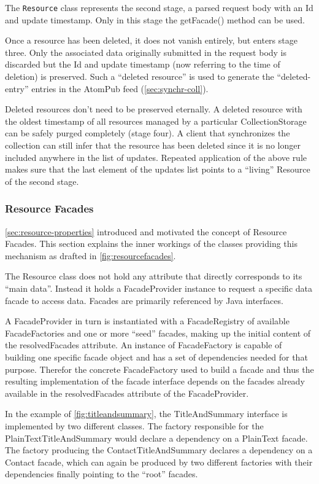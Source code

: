 \documentclass[12pt,a4paper,twoside]{scrartcl}		%
\begin{document}
The \lstinline:Resource: class represents the second stage, a parsed request
body with an Id and update timestamp. Only in this stage the getFacade() method
can be used.

Once a resource has been deleted, it does not vanish entirely, but enters stage
three. Only the associated data originally submitted in the request body is
discarded but the Id and update timestamp (now referring to the time of
deletion) is preserved. Such a ``deleted resource'' is used to generate the
``deleted-entry'' entries in the AtomPub feed (\autoref{sec:synchr-coll}).

Deleted resources don't need to be preserved eternally. A deleted resource with
the oldest timestamp of all resources managed by a particular CollectionStorage
can be safely purged completely (stage four). A client that synchronizes the
collection can still infer that the resource has been deleted since it is no
longer included anywhere in the list of updates. Repeated application of the
above rule makes sure that the last element of the updates list points to a
``living'' Resource of the second stage.

\subsubsection{Resource Facades}
\label{sec:resourcefacades}

\autoref{sec:resource-properties} introduced and motivated the concept of
Resource Facades. This section explains the inner workings of the classes
providing this mechanism as drafted in \autoref{fig:resourcefacades}.

The Resource class does not hold any attribute that directly corresponds to its
``main data''. Instead it holds a FacadeProvider instance to request a specific
data facade to access data. Facades are primarily referenced by Java interfaces.

A FacadeProvider in turn is instantiated with a FacadeRegistry of available
FacadeFactories and one or more ``seed'' facades, making up the initial content
of the resolvedFacades attribute. An instance of FacadeFactory is capable of
building one specific facade object and has a set of dependencies needed for
that purpose. Therefor the concrete FacadeFactory used to build a facade and
thus the resulting implementation of the facade interface depends on the facades
already available in the resolvedFacades attribute of the FacadeProvider.

In the example of \autoref{fig:titleandsummary}, the TitleAndSummary interface
is implemented by two different classes. The factory responsible for the
PlainTextTitleAndSummary would declare a dependency on a PlainText facade. The
factory producing the ContactTitleAndSummary declares a dependency on a Contact
facade, which can again be produced by two different factories with their
dependencies finally pointing to the ``root'' facades.
\end{document}
